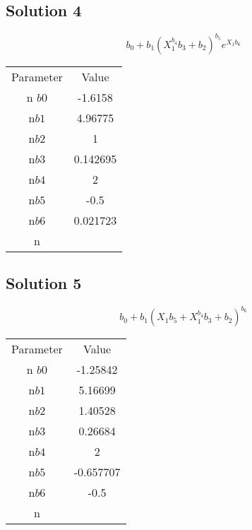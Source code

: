 \documentclass{article}
\begin{document}
\vspace{1em}
\subsection*{Solution 4}
\[
b_{0} + b_{1} \left(X_{1}^{b_{4}} b_{3} + b_{2}\right)^{b_{5}} e^{X_{1} b_{6}}
\]
\begin{center}
\begin{tabular}{cc}
\toprule
Parameter & Value \\n\midrule
$b0$ & -1.6158 \\n$b1$ & 4.96775 \\n$b2$ & 1 \\n$b3$ & 0.142695 \\n$b4$ & 2 \\n$b5$ & -0.5 \\n$b6$ & 0.021723 \\n\bottomrule
\end{tabular}
\end{center}

\vspace{1em}
\subsection*{Solution 5}
\[
b_{0} + b_{1} \left(X_{1} b_{5} + X_{1}^{b_{4}} b_{3} + b_{2}\right)^{b_{6}}
\]
\begin{center}
\begin{tabular}{cc}
\toprule
Parameter & Value \\n\midrule
$b0$ & -1.25842 \\n$b1$ & 5.16699 \\n$b2$ & 1.40528 \\n$b3$ & 0.26684 \\n$b4$ & 2 \\n$b5$ & -0.657707 \\n$b6$ & -0.5 \\n\bottomrule
\end{tabular}
\end{center}

\vspace{1em}
\end{document}
